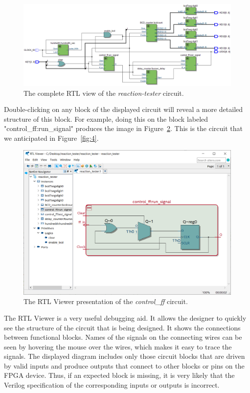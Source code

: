 \documentclass[11pt, twoside, pdftex]{article}
\begin{document}
\begin{figure}[H]
   \begin{center}
      \includegraphics[scale=0.45]{figures/figure15.png}
   \caption{The complete RTL view of the {\it reaction-tester} circuit.} 
	 \label{fig:15}
	 \end{center}
\end{figure}

Double-clicking on any block of the displayed circuit will reveal a more detailed
structure of this block. For example, doing this on the block labeled
"control\_ff:run\_signal" produces the image in Figure~\ref{fig:16}. This is the circuit that
we anticipated in Figure~\ref{fig:4}.

\begin{figure}[H]
   \begin{center}
      \includegraphics[scale=0.55]{figures/figure16.png}
   \caption{The RTL Viewer presentation of the {\it control\_ff} circuit.} 
	 \label{fig:16}
	 \end{center}
\end{figure}

The RTL Viewer is a very useful debugging aid. It allows the designer to quickly see
the structure of the circuit that is being designed. It shows the connections between
functional blocks. Names of the signals on the connecting wires can be seen by
hovering the mouse over the wires, which makes it easy to trace the signals. 
The displayed diagram includes only those circuit
blocks that are driven by valid inputs and produce outputs that connect to other
blocks or pins on the FPGA device. Thus, if an expected block is missing, it is 
very likely that the Verilog specification of the corresponding inputs or outputs
is incorrect.
\end{document}
